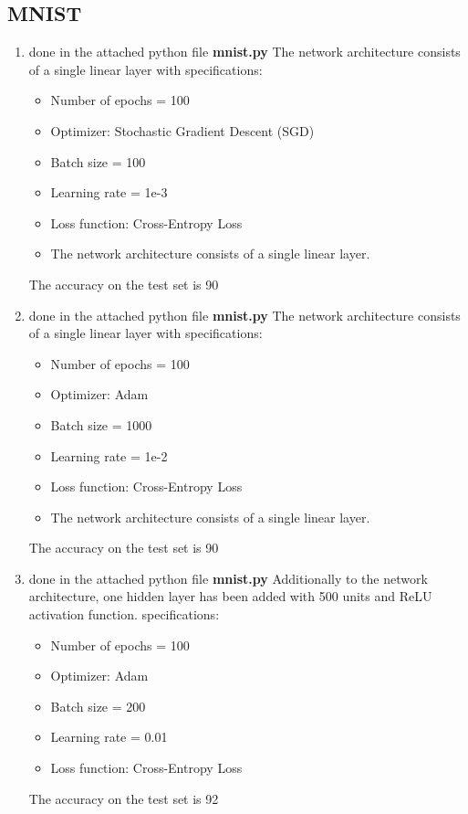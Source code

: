 \documentclass{assignmeownt}
\begin{document}
\subsection{MNIST}
    \begin{enumerate} %
        \item done in the attached python file \textbf{mnist.py} 
        \newline
        The network architecture consists of a single linear layer with specifications:
        \begin{itemize}
            \item Number of epochs = 100
            \item Optimizer: Stochastic Gradient Descent (SGD)
            \item Batch size = 100
            \item Learning rate = 1e-3
            \item Loss function: Cross-Entropy Loss
            \item The network architecture consists of a single linear layer.
        \end{itemize}
        The accuracy on the test set is 90%
        \item done in the attached python file \textbf{mnist.py}
        \newline
        The network architecture consists of a single linear layer with specifications:
        \begin{itemize}
            \item Number of epochs = 100
            \item Optimizer: Adam
            \item Batch size = 1000
            \item Learning rate = 1e-2
            \item Loss function: Cross-Entropy Loss
            \item The network architecture consists of a single linear layer.
        \end{itemize}
        The accuracy on the test set is 90%
        \item done in the attached python file \textbf{mnist.py}
        \newline
        Additionally to the network architecture, one hidden layer has been added with 500 units and ReLU activation function. 
        specifications:
        \begin{itemize}
            \item Number of epochs = 100
            \item Optimizer: Adam
            \item Batch size = 200
            \item Learning rate = 0.01
            \item Loss function: Cross-Entropy Loss
        \end{itemize}
        The accuracy on the test set is 92%
        

\end{enumerate}
\end{document}
